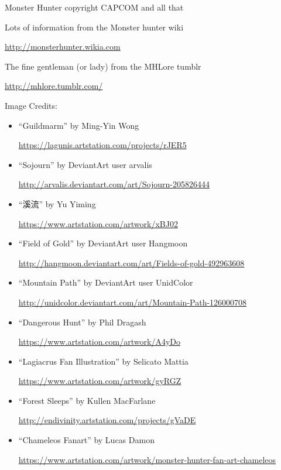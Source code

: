 \item Monster Hunter copyright CAPCOM and all that
\item Lots of information from the Monster hunter wiki

\url{http://monsterhunter.wikia.com}

\item The fine gentleman (or lady) from the MHLore tumblr

\url{http://mhlore.tumblr.com/}

\item Image Credits: \begin{itemize}

\item ``Guildmarm'' by Ming-Yin Wong

\url{https://lagunis.artstation.com/projects/rJER5}
\item ``Sojourn'' by DeviantArt user arvalis

\url{http://arvalis.deviantart.com/art/Sojourn-205826444}

\item ``溪流'' by Yu Yiming

\url{https://www.artstation.com/artwork/xBJ02}

\item ``Field of Gold'' by DeviantArt user Hangmoon

\url{http://hangmoon.deviantart.com/art/Fields-of-gold-492963608}

\item ``Mountain Path'' by DeviantArt user UnidColor

\url{http://unidcolor.deviantart.com/art/Mountain-Path-126000708}

\item ``Dangerous Hunt'' by Phil Dragash

\url{https://www.artstation.com/artwork/A4yDo}

\item ``Lagiacrus Fan Illustration'' by Selicato Mattia

\url{https://www.artstation.com/artwork/gyRGZ}

\item ``Forest Sleeps'' by Kullen MacFarlane

\url{http://endivinity.artstation.com/projects/gVaDE}

\item ``Chameleos Fanart'' by Lucas Damon

\url{https://www.artstation.com/artwork/monster-hunter-fan-art-chameleos}
\end{itemize}
